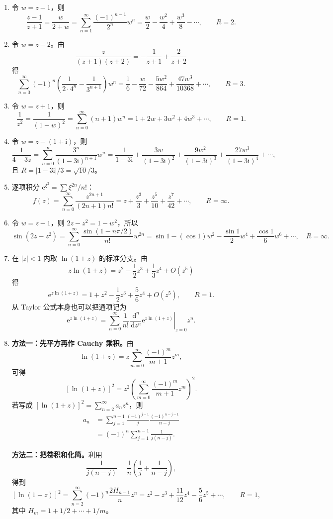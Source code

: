 \documentclass[UTF8,11pt,a4paper,fontset=fandol]{ctexart}
\newcommand{\ii}{\mathrm{i}}
\newcommand{\ee}{\mathrm{e}}
\newcommand{\dd}{\,\mathrm{d}}
\begin{document}
\begin{enumerate}
\item 令 $w=z-1$，则
\[
\frac{z-1}{z+1}=\frac{w}{2+w}
=\sum_{n=1}^{\infty}\frac{(-1)^{n-1}}{2^n}w^n
=\frac w2-\frac{w^2}4+\frac{w^3}8-\cdots,
\qquad R=2.
\]
\item 令 $w=z-2$。由
\[
\frac z{(z+1)(z+2)}=-\frac1{z+1}+\frac2{z+2}
\]
得
\[
\sum_{n=0}^{\infty}(-1)^n
\left(\frac1{2\cdot4^n}-\frac1{3^{n+1}}\right)w^n
=\frac16-\frac{w}{72}-\frac{5w^2}{864}+\frac{47w^3}{10368}+\cdots,
\qquad R=3.
\]
\item 令 $w=z+1$，则
\[
\frac1{z^2}=\frac1{(1-w)^2}
=\sum_{n=0}^{\infty}(n+1)w^n
=1+2w+3w^2+4w^3+\cdots,
\qquad R=1.
\]
\item 令 $w=z-(1+\ii)$，则
\[
\frac1{4-3z}
=\sum_{n=0}^{\infty}\frac{3^n}{(1-3\ii)^{n+1}}w^n
=\frac1{1-3\ii}+\frac{3w}{(1-3\ii)^2}
+\frac{9w^2}{(1-3\ii)^3}+\frac{27w^3}{(1-3\ii)^4}+\cdots,
\]
且 $R=|1-3\ii|/3=\sqrt{10}/3$。
\item 逐项积分 $\ee^{\xi^2}=\sum\xi^{2n}/n!$：
\[
f(z)=\sum_{n=0}^{\infty}\frac{z^{2n+1}}{(2n+1)n!}
=z+\frac{z^3}{3}+\frac{z^5}{10}+\frac{z^7}{42}+\cdots,
\qquad R=\infty.
\]
\item 令 $w=z-1$，则 $2z-z^2=1-w^2$，所以
\[
\sin(2z-z^2)=\sum_{n=0}^{\infty}\frac{\sin(1-n\pi/2)}{n!}w^{2n}
=\sin1-(\cos1)w^2-\frac{\sin1}{2}w^4+\frac{\cos1}{6}w^6+\cdots,
\quad R=\infty.
\]
\item 在 $|z|<1$ 内取 $\ln(1+z)$ 的标准分支。由
\[
z\ln(1+z)=z^2-\frac12z^3+\frac13z^4+O(z^5)
\]
得
\[
\ee^{z\ln(1+z)}=1+z^2-\frac12z^3+\frac56z^4+O(z^5),
\qquad R=1.
\]
从 Taylor 公式本身也可以把通项记为
\[
\ee^{z\ln(1+z)}
=\sum_{n=0}^{\infty}
\frac1{n!}\left.
\frac{\dd^n}{\dd z^n}\ee^{z\ln(1+z)}
\right|_{z=0}z^n.
\]

\item \textbf{方法一：先平方再作 Cauchy 乘积。}由
\[
\ln(1+z)=z\sum_{m=0}^{\infty}\frac{(-1)^m}{m+1}z^m,
\]
可得
\[
[\ln(1+z)]^2
=z^2\left(\sum_{m=0}^{\infty}
\frac{(-1)^m}{m+1}z^m\right)^2.
\]
若写成 $[\ln(1+z)]^2=\sum_{n=2}^{\infty}a_nz^n$，则
\begin{align*}
a_n
&=\sum_{j=1}^{n-1}
\frac{(-1)^{j-1}}j\frac{(-1)^{n-j-1}}{n-j}\\
&=(-1)^n\sum_{j=1}^{n-1}\frac1{j(n-j)}.
\end{align*}

\textbf{方法二：把卷积和化简。}利用
\[
\frac1{j(n-j)}=\frac1n\left(\frac1j+\frac1{n-j}\right),
\]
得到
\[
[\ln(1+z)]^2
=\sum_{n=2}^{\infty}(-1)^n\frac{2H_{n-1}}n z^n
=z^2-z^3+\frac{11}{12}z^4-\frac56z^5+\cdots,
\qquad R=1,
\]
其中 $H_m=1+1/2+\cdots+1/m$。


\end{enumerate}
\end{document}
